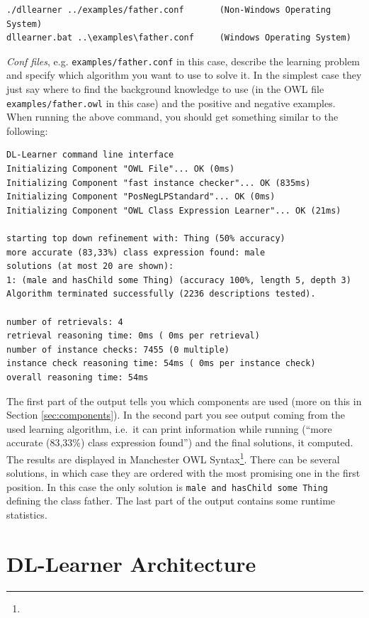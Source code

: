 \documentclass[a4paper,12pt]{scrartcl}
\begin{document}
\begin{verbatim}
./dllearner ../examples/father.conf       (Non-Windows Operating System)
dllearner.bat ..\examples\father.conf     (Windows Operating System)
\end{verbatim}

\emph{Conf files}, e.g. \verb|examples/father.conf| in this case, describe the learning problem and specify which algorithm you want to use to solve it. In the simplest case they just say where to find the background knowledge to use (in the OWL file \verb|examples/father.owl| in this case) and the positive and negative examples. When running the above command, you should get something similar to the following:

\begin{verbatim}
DL-Learner command line interface
Initializing Component "OWL File"... OK (0ms)
Initializing Component "fast instance checker"... OK (835ms)
Initializing Component "PosNegLPStandard"... OK (0ms)
Initializing Component "OWL Class Expression Learner"... OK (21ms)

starting top down refinement with: Thing (50% accuracy)
more accurate (83,33%) class expression found: male
solutions (at most 20 are shown):
1: (male and hasChild some Thing) (accuracy 100%, length 5, depth 3)
Algorithm terminated successfully (2236 descriptions tested).

number of retrievals: 4
retrieval reasoning time: 0ms ( 0ms per retrieval)
number of instance checks: 7455 (0 multiple)
instance check reasoning time: 54ms ( 0ms per instance check)
overall reasoning time: 54ms
\end{verbatim}

The first part of the output tells you which components are used (more on this in Section \ref{sec:components}). In the second part you see output coming from the used learning algorithm, i.e.~it can print information while running (``more accurate (83,33\%) class expression found'') and the final solutions, it computed. The results are displayed in Manchester OWL Syntax\footnote{\mos}. There can be several solutions, in which case they are ordered with the most promising one in the first position. In this case the only solution is \verb|male and hasChild some Thing| defining the class father. The last part of the output contains some runtime statistics.

\section{DL-Learner Architecture}
\end{document}
